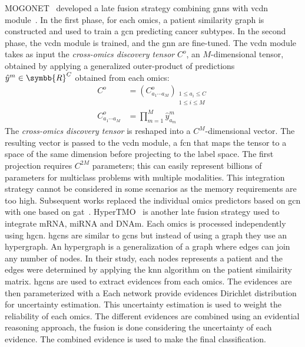 \documentclass[../main.tex]{subfiles}
\begin{document}
		MOGONET~\cite{MOGONET} developed a late fusion strategy combining \glspl{gnn} with \gls{vcdn} module~\cite{VCDN}.
		In the first phase, for each omics, a patient similarity graph is constructed and used to train a \gls{gcn} predicting cancer subtypes.
		In the second phase, the \gls{vcdn} module is trained, and the \gls{gnn} are fine-tuned.
		The \gls{vcdn} module takes as input the \emph{cross-omics discovery tensor} \(C^{o}\), an \(M\)-dimensional tensor, obtained by applying a generalized outer-product of predictions \(\hat{y}^{m} \in \symbb{R}^{C}\) obtained from each omics:
		\begin{align}
			C^{o}                     & = {\left(C^{o}_{a_{1}\cdots a_{M}}\right)}_{\substack{1 \leq a_{i} \leq C \\ 1 \leq i \leq M}} \\
			C^{o}_{a_{1}\cdots a_{M}} & = \prod_{m=1}^{M}\hat{y}_{a_{m}}^{m}
		\end{align}
		The \emph{cross-omics discovery tensor} is reshaped into a \(C^{M}\)-dimensional vector.
		The resulting vector is passed to the \gls{vcdn} module, a \gls{fcn} that maps the tensor to a space of the same dimension before projecting to the label space.
		The first projection requires \(C^{2M}\) parameters; this can easily represent billions of parameters for multiclass problems with multiple modalities.
		This integration strategy cannot be considered in some scenarios as the memory requirements are too high.
		Subsequent works replaced the individual omics predictors based on \gls{gcn} with one based on \gls{gat}~\cite{MODILM,Leng2022}.
		HyperTMO~\cite{Wang2024} is another late fusion strategy used to integrate mRNA, miRNA and DNAm.
		Each omics is processed independently using \gls{hgcn}.
		\Glspl{hgcn} are similar to \glspl{gcn} but instead of using a graph they use an hypergraph.
		An hypergraph is a generalization of a graph where edges can join any number of nodes.
		In their study, each nodes represents a patient and the edges were determined by applying the \gls{knn} algorithm on the patient similairity matrix.
		\Glspl{hgcn} are used to extract evidences from each omics.
		The evidences are then parameterized with a
		Each network provide evidences Dirichlet distribution for uncertainty estimation.
		This uncertainty estimation is used to weight the reliability of each omics.
		The different evidences are combined using an evidential reasoning approach, the fusion is done considering the uncertainty of each evidence.
		The combined evidence is used to make the final classification.
\end{document}
